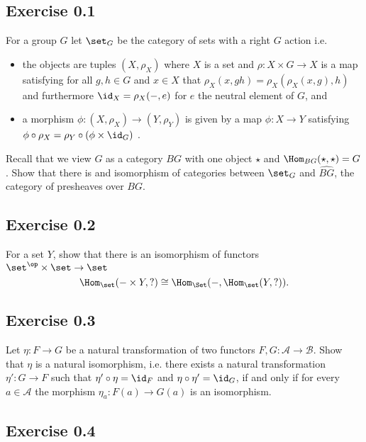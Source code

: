 \setcounter{section}{0}
\subsection{Exercise 0.1}

For a group $ G $ let $ \set_G $ be the category of sets with a right $ G $ action i.e. 
\begin{itemize}
    \item 
    the objects are tuples $ ( X , \rho_X ) $ where $ X $ is a set and $ \rho \colon X \times G \to X $ is a map satisfying for all $ g , h \in G $ and $ x \in X $ that $ \rho_X ( x , g h ) = \rho_X ( \rho_X ( x , g ) , h ) $ and furthermore $ \id_X = \rho_X ( - , e ) $ for $ e $ the neutral element of $ G $, and
    \item 
    a morphism $ \phi \colon ( X , \rho_X ) \to ( Y , \rho_Y ) $ is given by a map $ \phi \colon X \to Y $ satisfying $ \phi \circ \rho_X = \rho_Y \circ ( \phi \times \id_G ) $ .
\end{itemize}
Recall that we view $ G $ as a category $ B G $ with one object $ \star $ and  $ \Hom_{ B G } ( \star, \star ) = G $. 
Show that there is and isomorphism of categories between $ \set_G $ and $ \widehat{ BG } $, the category of presheaves over $ B G $.

\subsection{ Exercise 0.2 }

For a set $ Y $, show that there is an isomorphism of functors $ \set^{ \op } \times \set \to \set $
\[
    \Hom_{ \set } ( - \times Y , ? ) \cong  \Hom_{ \Set } ( - , \Hom_{ \set } ( Y , ? ) ).
\]

\subsection{ Exercise 0.3 }

Let $ \eta \colon F \to G $ be a natural transformation of two functors $ F , G \colon \mathcal{ A } \to \mathcal{ B } $.
Show that $ \eta $ is a natural isomorphism, i.e. there exists a natural transformation $ \eta' \colon G \to F $ such that $ \eta' \circ \eta = \id_F $ and $ \eta \circ \eta' = \id_G $, if and only if for every $ a \in \mathcal{ A } $ the morphism $ \eta_a \colon F ( a ) \to G ( a ) $ is an isomorphism.

\subsection{ Exercise 0.4 }

